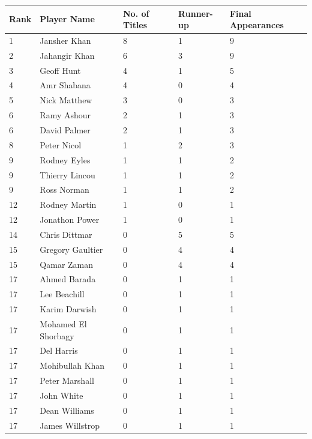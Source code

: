 \documentclass{article}
\begin{document}
\begin{tabular}{lllll}
\toprule
Rank & Player Name & No. of Titles & Runner-up & Final Appearances \\
\midrule
1 & Jansher Khan & 8 & 1 & 9 \\
2 & Jahangir Khan & 6 & 3 & 9 \\
3 & Geoff Hunt & 4 & 1 & 5 \\
4 & Amr Shabana & 4 & 0 & 4 \\
5 & Nick Matthew & 3 & 0 & 3 \\
6 & Ramy Ashour & 2 & 1 & 3 \\
6 & David Palmer & 2 & 1 & 3 \\
8 & Peter Nicol & 1 & 2 & 3 \\
9 & Rodney Eyles & 1 & 1 & 2 \\
9 & Thierry Lincou & 1 & 1 & 2 \\
9 & Ross Norman & 1 & 1 & 2 \\
12 & Rodney Martin & 1 & 0 & 1 \\
12 & Jonathon Power & 1 & 0 & 1 \\
14 & Chris Dittmar & 0 & 5 & 5 \\
15 & Gregory Gaultier & 0 & 4 & 4 \\
15 & Qamar Zaman & 0 & 4 & 4 \\
17 & Ahmed Barada & 0 & 1 & 1 \\
17 & Lee Beachill & 0 & 1 & 1 \\
17 & Karim Darwish & 0 & 1 & 1 \\
17 & Mohamed El Shorbagy & 0 & 1 & 1 \\
17 & Del Harris & 0 & 1 & 1 \\
17 & Mohibullah Khan & 0 & 1 & 1 \\
17 & Peter Marshall & 0 & 1 & 1 \\
17 & John White & 0 & 1 & 1 \\
17 & Dean Williams & 0 & 1 & 1 \\
17 & James Willstrop & 0 & 1 & 1 \\
\bottomrule
\end{tabular}
\end{document}
